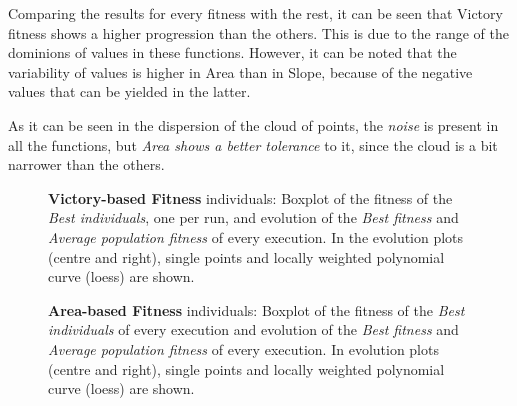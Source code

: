 \documentclass[preprint]{elsarticle}
\begin{document}
Comparing the results for every fitness with the rest, it can be seen that Victory fitness shows a higher progression than the others. This is due to the range of the dominions of values in these functions. However, it can be noted that the variability of values is higher in Area than in Slope, because of the negative values that can be yielded in the latter.

As it can be seen in the dispersion of the cloud of points, the \textit{noise} is present in all the functions, but \textit{Area shows a better tolerance} to it, since the cloud is a bit narrower than the others.


\begin{figure}[ht]
 \begin{center}
 \end{center} 
 \caption{\textbf{Victory-based Fitness} individuals: Boxplot of the fitness of the \emph{Best individuals}, one per run, and evolution of the \emph{Best fitness} and \emph{Average population fitness} of every execution. In the evolution plots (centre and right), single points and locally weighted polynomial curve (loess) are shown.}
 \label{figura:fitness_turns}
 \end{figure}

   \begin{figure}[ht]
 \begin{center}
 \end{center}
 \caption{\textbf{Area-based Fitness} individuals: Boxplot of the fitness of the \emph{Best individuals} of every execution and evolution of the \emph{Best fitness} and \emph{Average population fitness} of every execution. In evolution plots (centre and right), single points and locally weighted polynomial curve (loess) are shown.}
 \label{figura:fitness_area}
 \end{figure}
\end{document}
